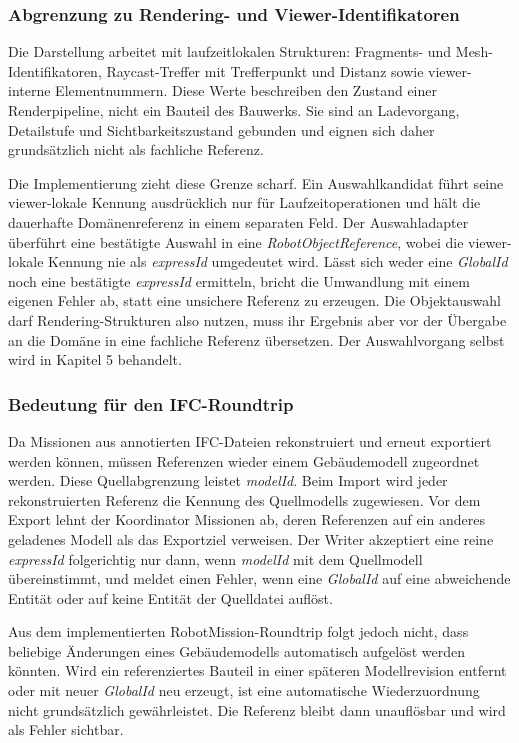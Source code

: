 \subsubsection{Abgrenzung zu Rendering- und Viewer-Identifikatoren}
Die Darstellung arbeitet mit laufzeitlokalen Strukturen: Fragments- und Mesh-Identifikatoren,
Raycast-Treffer mit Trefferpunkt und Distanz sowie viewer-interne Elementnummern. Diese Werte
beschreiben den Zustand einer Renderpipeline, nicht ein Bauteil des Bauwerks. Sie sind an
Ladevorgang, Detailstufe und Sichtbarkeitszustand gebunden und eignen sich daher grundsätzlich nicht
als fachliche Referenz.

Die Implementierung zieht diese Grenze scharf. Ein Auswahlkandidat führt seine viewer-lokale Kennung
ausdrücklich nur für Laufzeitoperationen und hält die dauerhafte Domänenreferenz in einem separaten
Feld. Der Auswahladapter überführt eine bestätigte Auswahl in eine \textit{RobotObjectReference},
wobei die viewer-lokale Kennung nie als \textit{expressId} umgedeutet wird. Lässt sich weder eine
\textit{GlobalId} noch eine bestätigte \textit{expressId} ermitteln, bricht die Umwandlung mit einem
eigenen Fehler ab, statt eine unsichere Referenz zu erzeugen. Die Objektauswahl darf
Rendering-Strukturen also nutzen, muss ihr Ergebnis aber vor der Übergabe an die Domäne in eine
fachliche Referenz übersetzen. Der Auswahlvorgang selbst wird in Kapitel 5 behandelt.

\subsubsection{Bedeutung für den IFC-Roundtrip}
Da Missionen aus annotierten IFC-Dateien rekonstruiert und erneut exportiert werden können, müssen
Referenzen wieder einem Gebäudemodell zugeordnet werden. Diese Quellabgrenzung leistet
\textit{modelId}. Beim Import wird jeder rekonstruierten Referenz die Kennung des Quellmodells
zugewiesen. Vor dem Export lehnt der Koordinator Missionen ab, deren Referenzen auf ein anderes
geladenes Modell als das Exportziel verweisen. Der Writer akzeptiert eine reine \textit{expressId}
folgerichtig nur dann, wenn \textit{modelId} mit dem Quellmodell übereinstimmt, und meldet einen
Fehler, wenn eine \textit{GlobalId} auf eine abweichende Entität oder auf keine Entität der
Quelldatei auflöst.

Aus dem implementierten RobotMission-Roundtrip folgt jedoch nicht, dass beliebige Änderungen eines
Gebäudemodells automatisch aufgelöst werden könnten. Wird ein referenziertes Bauteil in einer
späteren Modellrevision entfernt oder mit neuer \textit{GlobalId} neu erzeugt, ist eine automatische
Wiederzuordnung nicht grundsätzlich gewährleistet. Die Referenz bleibt dann unauflösbar und wird als
Fehler sichtbar.

